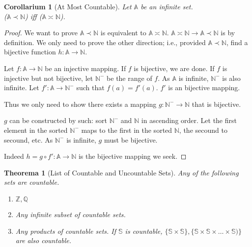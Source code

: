 \documentclass[12pt, a4paper]{report}
\newtheorem{theorem}{Theorema}[section]
\newtheorem{corollary}{Corollarium}[section]
\theoremstyle{definition}
\theoremstyle{definition}
\theoremstyle{remark}
\begin{document}
\begin{corollary}[At Most Countable]
	Let $\mathbb{A}$ be an infinite set. \\($\mathbb{A} \prec \mathbb{N}$) iff ($\mathbb{A} \asymp \mathbb{N}$).
\end{corollary}

\begin{proof}
	We want to prove $\mathbb{A} \prec \mathbb{N}$ is equivalent to $\mathbb{A} \asymp \mathbb{N}$. $\mathbb{A} \asymp \mathbb{N} \rightarrow \mathbb{A} \prec \mathbb{N}$ is by definition. 
	We only need to prove the other direction; i.e., provided $\mathbb{A} \prec \mathbb{N}$, find a bijective function $h: \mathbb{A} \rightarrow \mathbb{N}$.

	Let $f: \mathbb{A} \rightarrow \mathbb{N}$ be an injective mapping. If $f$ is bijective, we are done. If $f$ is injective but not bijective, let $\mathbb{N}^-$ be the range of $f.$ As $\mathbb{A}$ is infinite, $\mathbb{N}^-$ is also infinite.  
	Let $f': \mathbb{A} \rightarrow \mathbb{N}^-$ such that $f(a) = f'(a).$ $f'$ is an bijective mapping. 
	
    Thus we only need to show there exists a mapping $g: \mathbb{N}^- \rightarrow \mathbb{N}$ that is bijective. 

	$g$ can be constructed by such: sort $\mathbb{N}^-$ and $\mathbb{N}$ in ascending order. Let the first element in the sorted $\mathbb{N}^-$ maps to the first in the sorted $\mathbb{N}$, the secound to secound, etc.
	As $\mathbb{N}^-$ is infinite, $g$ must be bijective.

	Indeed $h = g \circ f': \mathbb{A} \rightarrow \mathbb{N}$ is the bijective mapping we seek. 
\end{proof}

\begin{theorem}[List of Countable and Uncountable Sets]
	Any of the following sets are countable.
	\begin{enumerate}
		\item $\mathbb{Z}, \mathbb{Q}$ 
		\item Any infinite subset of countable sets.
		\item Any products of countable sets. If $\mathbb{S}$ is countable, $\{\mathbb{S}\times \mathbb{S}\}, \{\mathbb{S}\times \mathbb{S}\times \dots \times \mathbb{S}) \}$ are also countable.
	\end{enumerate}
\end{theorem}
\end{document}
